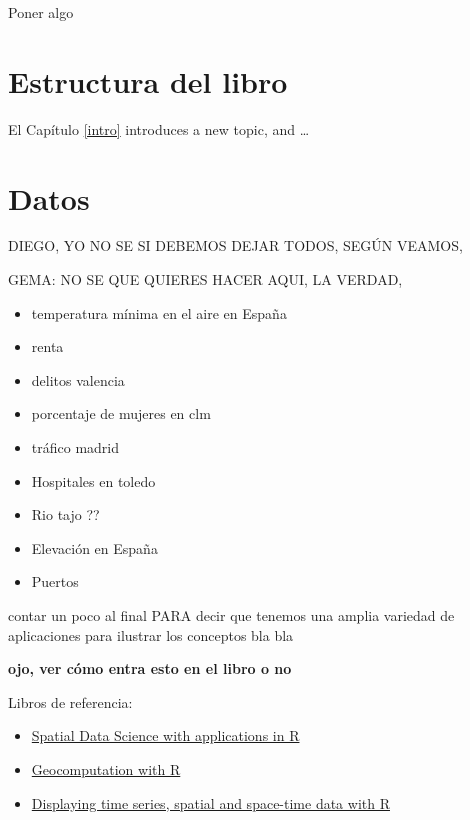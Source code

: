 \documentclass[
]{book}
\providecommand{\tightlist}{%
  \setlength{\itemsep}{0pt}\setlength{\parskip}{0pt}}
\theoremstyle{definition}
\theoremstyle{definition}
\theoremstyle{definition}
\theoremstyle{definition}
\theoremstyle{remark}
\begin{document}
Poner algo

\hypertarget{estructura-del-libro}{%
\section*{Estructura del libro}\label{estructura-del-libro}}

El Capítulo \ref{intro} introduces a new topic, and \ldots{}

\hypertarget{datos}{%
\section*{Datos}\label{datos}}

DIEGO, YO NO SE SI DEBEMOS DEJAR TODOS, SEGÚN VEAMOS,

GEMA: NO SE QUE QUIERES HACER AQUI, LA VERDAD,

\begin{itemize}
\tightlist
\item
  temperatura mínima en el aire en España
\item
  renta
\item
  delitos valencia
\item
  porcentaje de mujeres en clm
\item
  tráfico madrid
\item
  Hospitales en toledo
\item
  Rio tajo ??
\item
  Elevación en España
\item
  Puertos
\end{itemize}

contar un poco al final PARA decir que tenemos una amplia variedad de
aplicaciones para ilustrar los conceptos bla bla

\textbf{ojo, ver cómo entra esto en el libro o no}

Libros de referencia:

\begin{itemize}
\item
  \href{https://keen-swartz-3146c4.netlify.app/}{Spatial Data Science with applications in
  R}
\item
  \href{https://geocompr.robinlovelace.net/}{Geocomputation with R}
\item
  \href{https://oscarperpinan.github.io/bookvis/}{Displaying time series, spatial and space-time data with
  R}
\end{itemize}
\end{document}

